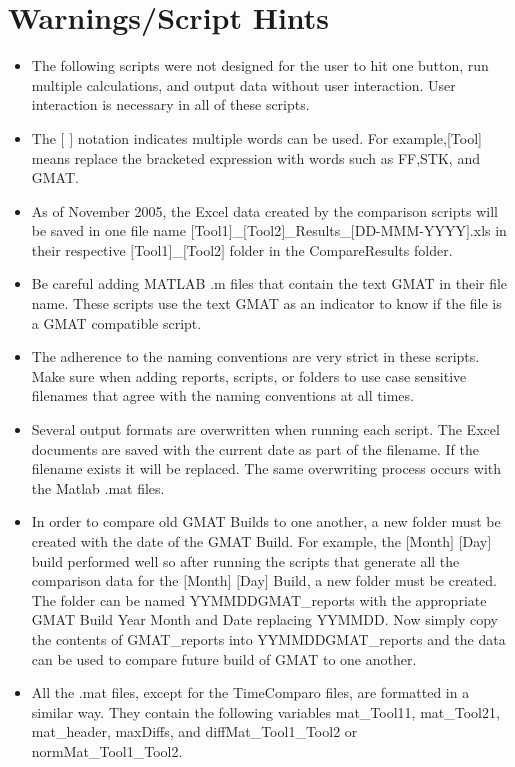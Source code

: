 \section{Warnings/Script Hints}
\begin{itemize}
  \item The following scripts were not designed for the user to hit one
  button, run multiple calculations, and output data without user
  interaction. User interaction is necessary in all of these scripts.
  \item The $[$ $]$ notation indicates multiple words can be used.
  For example,[Tool] means replace the bracketed expression with
  words such as FF,STK, and GMAT.
  \item As of November 2005, the Excel data created by the comparison
  scripts will be saved in one file name $[$Tool1$]$\_$[$Tool2$]$\_Results\_$[$DD-MMM-YYYY$]$.xls
  in their respective $[$Tool1$]$\_$[$Tool2$]$ folder in the CompareResults folder.
  \item Be careful adding MATLAB .m files that contain the text GMAT
  in their file name. These scripts use the text GMAT as an indicator
  to know if the file is a GMAT compatible script.
  \item The adherence to the naming conventions are very strict in these
  scripts. Make sure when adding reports, scripts, or folders to use
  case sensitive filenames that agree with the naming conventions
  at all times.
  \item Several output formats are overwritten when running each script. The
  Excel documents are saved with the current date as part of the
  filename. If the filename exists it will be replaced. The same
  overwriting process occurs with the Matlab .mat files.
  \item In order to compare old GMAT Builds to one another, a new folder
  must be created with the date of the GMAT Build. For example, the
  $[$Month$]$ $[$Day$]$ build performed well so after running the scripts that
  generate all the comparison data for the $[$Month$]$ $[$Day$]$ Build, a new
  folder must be created. The folder can be named YYMMDDGMAT\_reports
  with the appropriate GMAT Build Year Month and Date replacing
  YYMMDD. Now simply copy the contents of GMAT\_reports into
  YYMMDDGMAT\_reports and the data can be used to compare future build
  of GMAT to one another.
  \item All the .mat files, except for the TimeComparo files, are formatted
  in a similar way. They contain the following variables mat\_Tool11,
  mat\_Tool21, mat\_header, maxDiffs, and diffMat\_Tool1\_Tool2 or
  normMat\_Tool1\_Tool2.\\


\end{itemize}
